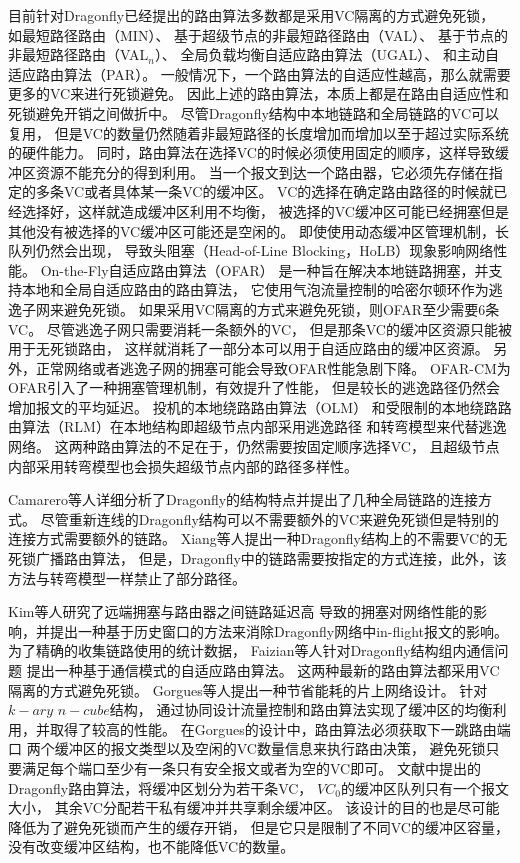 目前针对Dragonfly已经提出的路由算法多数都是采用VC隔离的方式避免死锁，
如最短路径路由（MIN）、
基于超级节点的非最短路径路由（VAL）、
基于节点的非最短路径路由（VAL$_{n}$）、
全局负载均衡自适应路由算法（UGAL）、
和主动自适应路由算法（PAR）。
一般情况下，一个路由算法的自适应性越高，那么就需要更多的VC来进行死锁避免。
因此上述的路由算法，本质上都是在路由自适应性和死锁避免开销之间做折中。
尽管Dragonfly结构中本地链路和全局链路的VC可以复用，
但是VC的数量仍然随着非最短路径的长度增加而增加以至于超过实际系统的硬件能力。
同时，路由算法在选择VC的时候必须使用固定的顺序，这样导致缓冲区资源不能充分的得到利用。
当一个报文到达一个路由器，它必须先存储在指定的多条VC或者具体某一条VC的缓冲区。
VC的选择在确定路由路径的时候就已经选择好，这样就造成缓冲区利用不均衡，
被选择的VC缓冲区可能已经拥塞但是其他没有被选择的VC缓冲区可能还是空闲的。
即使使用动态缓冲区管理机制，长队列仍然会出现，
导致头阻塞（Head-of-Line Blocking，HoLB）现象影响网络性能。
On-the-Fly自适应路由算法（OFAR）
是一种旨在解决本地链路拥塞，并支持本地和全局自适应路由的路由算法，
它使用气泡流量控制的哈密尔顿环作为逃逸子网来避免死锁。
如果采用VC隔离的方式来避免死锁，则OFAR至少需要6条VC。
尽管逃逸子网只需要消耗一条额外的VC，
但是那条VC的缓冲区资源只能被用于无死锁路由，
这样就消耗了一部分本可以用于自适应路由的缓冲区资源。
另外，正常网络或者逃逸子网的拥塞可能会导致OFAR性能急剧下降。
OFAR-CM为OFAR引入了一种拥塞管理机制，有效提升了性能，
但是较长的逃逸路径仍然会增加报文的平均延迟。
投机的本地绕路路由算法（OLM）
和受限制的本地绕路路由算法（RLM）在本地结构即超级节点内部采用逃逸路径
和转弯模型来代替逃逸网络。
这两种路由算法的不足在于，仍然需要按固定顺序选择VC，
且超级节点内部采用转弯模型也会损失超级节点内部的路径多样性。

Camarero等人详细分析了Dragonfly的结构特点并提出了几种全局链路的连接方式。
尽管重新连线的Dragonfly结构可以不需要额外的VC来避免死锁但是特别的连接方式需要额外的链路。
Xiang等人提出一种Dragonfly结构上的不需要VC的无死锁广播路由算法，
但是，Dragonfly中的链路需要按指定的方式连接，此外，该方法与转弯模型一样禁止了部分路径。

Kim等人研究了远端拥塞与路由器之间链路延迟高
导致的拥塞对网络性能的影响，并提出一种基于历史窗口的方法来消除Dragonfly网络中in-flight报文的影响。
为了精确的收集链路使用的统计数据，
Faizian等人针对Dragonfly结构组内通信问题
提出一种基于通信模式的自适应路由算法。
这两种最新的路由算法都采用VC隔离的方式避免死锁。
Gorgues等人提出一种节省能耗的片上网络设计。
针对$k-ary$ $n-cube$结构，
通过协同设计流量控制和路由算法实现了缓冲区的均衡利用，并取得了较高的性能。
在Gorgues的设计中，路由算法必须获取下一跳路由端口
两个缓冲区的报文类型以及空闲的VC数量信息来执行路由决策，
避免死锁只要满足每个端口至少有一条只有安全报文或者为空的VC即可。
文献中提出的Dragonfly路由算法，将缓冲区划分为若干条VC，
$VC_{0}$的缓冲区队列只有一个报文大小，
其余VC分配若干私有缓冲并共享剩余缓冲区。
该设计的目的也是尽可能降低为了避免死锁而产生的缓存开销，
但是它只是限制了不同VC的缓冲区容量，没有改变缓冲区结构，也不能降低VC的数量。

